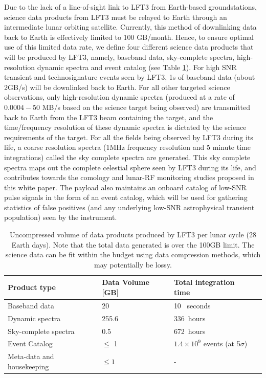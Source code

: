 Due to the lack of a line-of-sight link to LFT3 from Earth-based groundstations, science data products from LFT3 must be relayed to Earth through an intermediate lunar orbiting satellite. Currently, this method of downlinking data back to Earth is effectively limited to 100 GB/month. Hence, to ensure optimal use of this limited data rate, we define four different science data products that will be produced by LFT3, namely, baseband data, sky-complete spectra, high-resolution dynamic spectra and event catalog (see Table \ref{tab:data}). For high SNR transient and technosignature events seen by LFT3, 1s of baseband data (about 2GB/s) will be downlinked back to Earth. For all other targeted science observations, only high-resolution dynamic spectra (produced at a rate of $0.0004 - 50$ MB/s based on the science target being observed) are transmitted back to Earth from the LFT3 beam containing the target, and the time/frequency resolution of these dynamic spectra is dictated by the science requirements of the target. For all the fields being observed by LFT3 during its life, a coarse resolution spectra (1MHz frequency resolution and 5 minute time integrations) called the sky complete spectra are generated. This sky complete spectra maps out the complete celestial sphere seen by LFT3 during its life, and contributes towards the comology and lunar-RF monitoring studies proposed in this white paper. The payload also maintains an onboard catalog of low-SNR pulse signals in the form of an event catalog, which will be used for gathering statistics of false positives (and any underlying low-SNR astrophysical transient population) seen by the instrument.

\begin{table}
    \centering
    \caption{Uncompressed volume of data products produced by LFT3 per lunar cycle (28 Earth days). Note that the total data generated is over the 100GB limit. The science data can be fit within the budget using data compression methods, which may potentially be lossy.}
    \begin{tabular}{|l|l|l|l|} \hline
    \textbf{Product type} & \textbf{Data Volume [GB]} & \textbf{Total integration time} \\ \hline
    Baseband data        & 20 &  10 \, seconds \\ \hline
    Dynamic spectra      & 255.6 & 336\, hours  \\ \hline
    Sky-complete spectra & 0.5 & 672\, hours \\  \hline
    Event Catalog        & $\le$ 1 & $1.4\times 10^9$ events (at 5$\sigma$) \\ \hline
    Meta-data and housekeeping & $\le 1$ & - \\ \hline
    \end{tabular}
    \label{tab:data}
\end{table}

